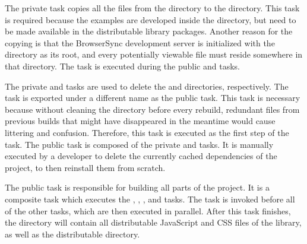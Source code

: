 The private  task copies all the files from the
 directory to the  directory. This
task is required because the examples are developed inside the
 directory, but need to be made available in the
distributable library packages. Another reason for the copying is that
the BrowserSync development server is initialized with the
 directory as its root, and every potentially viewable
file must reside somewhere in that directory. The 
task is executed during the public  and 
tasks.

The private  and  tasks are
used to delete the  and  directories,
respectively. The  task is exported under a different
name as the public  task. This task is necessary because
without cleaning the  directory before every rebuild,
redundant files from previous builds that might have disappeared in
the meantime would cause littering and confusion. Therefore, this task
is executed as the first step of the  task. The public
 task is composed of the private  and
 tasks. It is manually executed by a developer
to delete the currently cached dependencies of the project, to then
reinstall them from scratch.

The public  task is responsible for building all parts of
the project. It is a composite task which executes the ,
, , and  tasks. The
 task is invoked before all of the other tasks, which are
then executed in parallel. After this task finishes, the 
directory will contain all distributable JavaScript and CSS files of
the library, as well as the distributable  directory.

